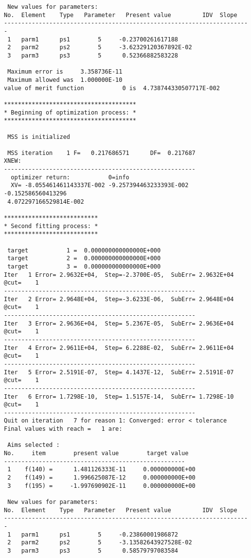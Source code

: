 \begin{footnotesize}
\begin{verbatim}
 New values for parameters:
No.  Element    Type   Parameter   Present value         IDV  Slope
-----------------------------------------------------------------------
 1   parm1      ps1        5     -0.23700261617188
 2   parm2      ps2        5     -3.62329120367892E-02
 3   parm3      ps3        5      0.52366882583228

 Maximum error is     3.358736E-11
 Maximum allowed was  1.000000E-10
value of merit function           0 is  4.738744330507717E-002

**************************************
* Beginning of optimization process: *
**************************************

 MSS is initialized

 MSS iteration    1 F=   0.217686571      DF=  0.217687
XNEW:
-------------------------------------------------------
  optimizer return:           0=info
  XV= -8.055461461143337E-002 -9.257394463233393E-002 -0.152586560413296
 4.072297166529814E-002

***************************
* Second fitting process: *
***************************

 target           1 =  0.000000000000000E+000
 target           2 =  0.000000000000000E+000
 target           3 =  0.000000000000000E+000
Iter   1 Error= 2.9632E+04,  Step=-2.3700E-05,  SubErr= 2.9632E+04 @cut=    1
-------------------------------------------------------
Iter   2 Error= 2.9648E+04,  Step=-3.6233E-06,  SubErr= 2.9648E+04 @cut=    1
-------------------------------------------------------
Iter   3 Error= 2.9636E+04,  Step= 5.2367E-05,  SubErr= 2.9636E+04 @cut=    1
-------------------------------------------------------
Iter   4 Error= 2.9611E+04,  Step= 6.2288E-02,  SubErr= 2.9611E+04 @cut=    1
-------------------------------------------------------
Iter   5 Error= 2.5191E-07,  Step= 4.1437E-12,  SubErr= 2.5191E-07 @cut=    1
-------------------------------------------------------
Iter   6 Error= 1.7298E-10,  Step= 1.5157E-14,  SubErr= 1.7298E-10 @cut=    1
-------------------------------------------------------
Quit on iteration   7 for reason 1: Converged: error < tolerance
Final values with reach =   1 are:

 Aims selected :
No.     item        present value        target value
----------------------------------------------------
 1    f(140) =      1.481126333E-11     0.000000000E+00
 2    f(149) =      1.996625087E-12     0.000000000E+00
 3    f(195) =     -1.997690902E-11     0.000000000E+00

 New values for parameters:
No.  Element    Type   Parameter   Present value         IDV  Slope
-----------------------------------------------------------------------
 1   parm1      ps1        5     -0.23860001986872
 2   parm2      ps2        5     -3.13582643927528E-02
 3   parm3      ps3        5      0.58579797083584


\end{verbatim}
\end{footnotesize}
